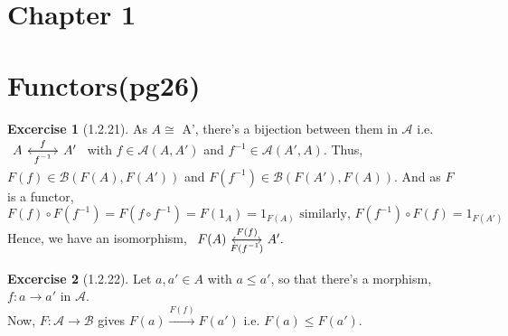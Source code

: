 \documentclass{article}
\theoremstyle{definition}
\newtheorem*{excercise}{Excercise}
\begin{document}
\section{Chapter 1}

\section{Functors(pg26)}

\begin{excercise}[1.2.21] %
	As $A \cong $ A', there's a bijection between them in $\mathcal{A} $ i.e.
	$\begin{tikzcd}
		A \arrow{r}{f} & \arrow{l}{f^{-1}}  A'
	\end{tikzcd}$
	with $f \in \mathcal{A}(A,A')$ and $ f^{-1} \in \mathcal{A}(A',A)$.
	Thus, $F(f) \in \mathcal{B}(F(A),F(A'))$ and $ F(f^{-1}) \in \mathcal{B}(F(A'),F(A))$.
	And as $F$ is a functor,
	\[ F(f) \circ F(f^{-1}) = F(f \circ f^{-1}) = F(1_A) = 1_{F(A)} \text{ similarly, }
	F(f^{-1}) \circ F(f) = 1_{F(A')} \]
	Hence, we have an isomorphism, $
	\begin{tikzcd}
		F(A) \arrow{r}{F(f)} & \arrow{l}{F(f^{-1})} A'.
	\end{tikzcd}$
\end{excercise}
\begin{excercise}[1.2.22] %
	Let $a,a' \in A $ with $a \leq a'$, so that there's a morphism, $f:a\rightarrow a'$ in $\mathcal{A}$.\\
	Now, $F:\mathcal{A} \rightarrow \mathcal{B} $ gives $F(a) \xrightarrow{F(f)} F(a')$ i.e. $F(a)\leq F(a')$.
\end{excercise}
\end{document}
